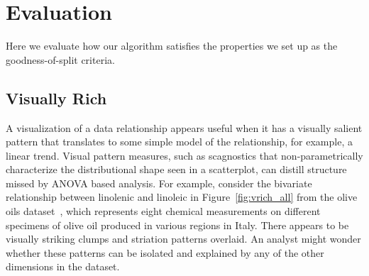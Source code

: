 \section{Evaluation}
\label{sec:evaluation}
Here we evaluate how our algorithm satisfies the properties we set up as the goodness-of-split criteria.

\subsection{Visually Rich}

A visualization of a data relationship appears useful when it has a visually salient pattern that translates to some simple model of the relationship, for example, a linear trend. Visual pattern measures, such as scagnostics that non-parametrically characterize the distributional shape seen in a scatterplot, can distill structure missed by ANOVA based analysis. For example, consider the bivariate relationship between linolenic and linoleic in Figure~\ref{fig:vrich_all} from the olive oils dataset~\cite{Forina1983}, which represents eight chemical measurements on different specimens of olive oil produced in various regions in Italy. There appears to be visually striking clumps and striation patterns overlaid. An analyst might wonder whether these patterns can be isolated and explained by any of the other dimensions in the dataset.
 
